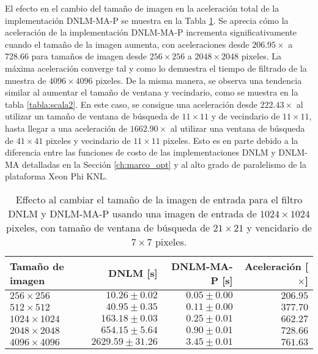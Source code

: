 El efecto en el cambio del tama\~no de imagen en la aceleración total de la implementación DNLM-MA-P se muestra en la Tabla \ref{tabla:scala1}. Se aprecia cómo la aceleración de la implementación DNLM-MA-P incrementa significativamente cuando el tama\~no de la imagen aumenta, con aceleraciones desde $206.95\times$ a $728.66$ para tama\~nos de imagen desde $256 \times 256$ a $2048 \times 2048$ pixeles. La máxima aceleración converge tal y como lo demuestra el tiempo de filtrado de la muestra de $4096\times 4096$ pixeles.  
De la misma manera, se observa una tendencia similar al aumentar el tama\~no de ventana y vecindario, como se muestra en la tabla \ref{tabla:scala2}. En este caso, se consigue una aceleración desde $222.43\times$ al utilizar un tama\~no de ventana de búsqueda de $11 \times 11$ y de vecindario de $11 \times 11$, hasta llegar a una aceleración de $1662.90\times$ al utilizar una ventana de búsqueda de $41 \times 41$ pixeles y vecindario de $11 \times 11$ pixeles. Esto es en parte debido a la diferencia entre las funciones de costo de las implementaciones DNLM y DNLM-MA detalladas en la Sección \ref{ch:marco_opt} y al alto grado de paralelismo de la plataforma Xeon Phi KNL.


\begin{table}[htb]
\protect\caption[Efecto al cambiar tama\~no de imagen de entrada]{Effecto al cambiar el tama\~no de la imagen de entrada para el filtro DNLM y DNLM-MA-P usando una imagen de entrada de  $1024 \times 1024$ pixeles, con tama\~no de ventana de búsqueda de $21 \times 21$ y vencidario de $7 \times 7$ pixeles. \label{tabla:scala1}}
\centering
\begin{tabular}{lrrr}
Tama\~no de imagen & DNLM [s]& DNLM-MA-P [s]& Aceleración [$\times$] \tabularnewline
\hline
$256 \times 256$ & $10.26\pm0.02$ & $0.05\pm0.00$ & $206.95$ \tabularnewline
$512 \times 512$ & $40.95\pm0.35$ & $0.11\pm0.00$ & $377.70$ \tabularnewline
$1024 \times 1024$ & $163.18\pm0.03$ & $0.25\pm0.01$ & $662.27$ \tabularnewline
$2048 \times 2048$ & $654.15\pm5.64$ & $0.90\pm0.01$ & $728.66$ \tabularnewline
$4096 \times 4096$ & $2629.59\pm31.26$ & $3.45\pm0.01$ & $761.63$ \tabularnewline
\end{tabular}
\end{table}


